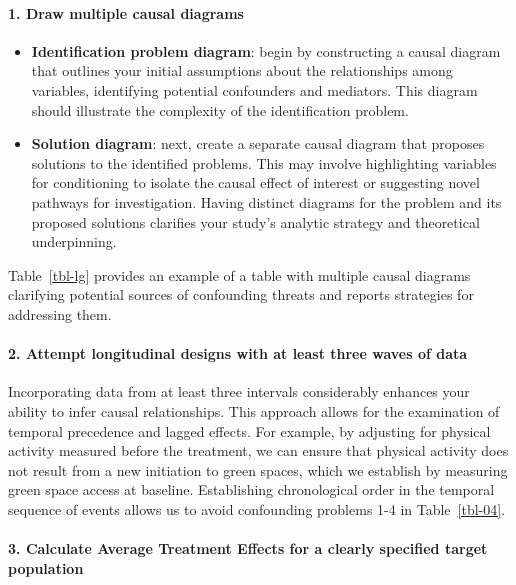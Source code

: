 \documentclass[
  singlecolumn]{article}
\let\oldparagraph\paragraph
\renewcommand{\paragraph}[1]{\oldparagraph{#1}\mbox{}}
\providecommand{\tightlist}{%
  \setlength{\itemsep}{0pt}\setlength{\parskip}{0pt}}\usepackage{longtable,booktabs,array}
\begin{document}
\paragraph{1. Draw multiple causal
diagrams}\label{draw-multiple-causal-diagrams-1}

\begin{itemize}
\tightlist
\item
  \textbf{Identification problem diagram}: begin by constructing a
  causal diagram that outlines your initial assumptions about the
  relationships among variables, identifying potential confounders and
  mediators. This diagram should illustrate the complexity of the
  identification problem.
\item
  \textbf{Solution diagram}: next, create a separate causal diagram that
  proposes solutions to the identified problems. This may involve
  highlighting variables for conditioning to isolate the causal effect
  of interest or suggesting novel pathways for investigation. Having
  distinct diagrams for the problem and its proposed solutions clarifies
  your study's analytic strategy and theoretical underpinning.
\end{itemize}

Table~\ref{tbl-lg} provides an example of a table with multiple causal
diagrams clarifying potential sources of confounding threats and reports
strategies for addressing them.

\paragraph{2. Attempt longitudinal designs with at least three waves of
data}\label{attempt-longitudinal-designs-with-at-least-three-waves-of-data}

Incorporating data from at least three intervals considerably enhances
your ability to infer causal relationships. This approach allows for the
examination of temporal precedence and lagged effects. For example, by
adjusting for physical activity measured before the treatment, we can
ensure that physical activity does not result from a new initiation to
green spaces, which we establish by measuring green space access at
baseline. Establishing chronological order in the temporal sequence of
events allows us to avoid confounding problems 1-4 in
Table~\ref{tbl-04}.

\paragraph{3. Calculate Average Treatment Effects for a clearly
specified target
population}\label{calculate-average-treatment-effects-for-a-clearly-specified-target-population}
\end{document}
